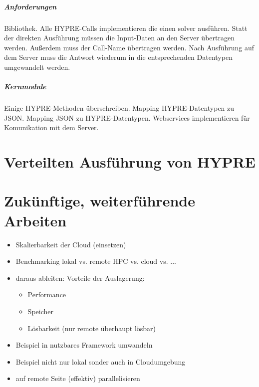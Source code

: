 \documentclass[a4paper,10pt]{article}
\begin{document}
\subparagraph{Anforderungen}

Bibliothek.
Alle HYPRE-Calls implementieren die einen solver ausführen.
Statt der direkten Ausführung müssen die Input-Daten an den Server übertragen werden.
Außerdem muss der Call-Name übertragen werden.
Nach Ausführung auf dem Server muss die Antwort wiederum in die entsprechenden Datentypen umgewandelt werden.

\subparagraph{Kernmodule}

Einige HYPRE-Methoden überschreiben.
Mapping HYPRE-Datentypen zu JSON.
Mapping JSON zu HYPRE-Datentypen.
Webservices implementieren für Komunikation mit dem Server.

\newpage













\section{Verteilten Ausführung von HYPRE}

\newpage













\section{Zukünftige, weiterführende Arbeiten}


\begin{itemize}
 \item Skalierbarkeit der Cloud (einsetzen)
 \item Benchmarking lokal vs. remote HPC vs. cloud vs. ...
 \item daraus ableiten: Vorteile der Auslagerung:
  \begin{itemize}
    \item Performance
    \item Speicher
    \item Lösbarkeit (nur remote überhaupt lösbar)
  \end{itemize}
 \item Beispiel in nutzbares Framework umwandeln
 \item Beispiel nicht nur lokal sonder auch in Cloudumgebung
 \item auf remote Seite (effektiv) parallelisieren
\end{itemize}
\end{document}
